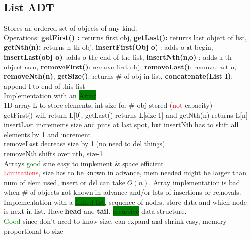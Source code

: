 \subsection{List ADT} Stores an ordered set of objects of any kind. 
\\Operations: \textbf{getFirst() :} returns first obj, \textbf{getLast():} returns last object of list, \textbf{getNth(n):} returns n-th obj, \textbf{insertFirst(Obj o)} : adds o at begin, \textbf{insertLast(obj o)}: adds o the end of the list,\textbf{ insertNth(n,o)} : adds n-th object as o,\textbf{ removeFirst()}: remove first obj, \textbf{removeLast()}: remove last o, \textbf{removeNth(n)}, \textbf{getSize()}: returns \# of obj in list, \textbf{concatenate(List I)}: append I to end of this list
\\ Implementation with an \colorbox{Green}{Array}
\\ 1D array L to store elements, int size for \# obj stored (\textcolor{Red}{not} capacity)
\\ getFirst() will return L[0], getLast() returns L[size-1] and getNth(n) returns L[n]
\\ insertLast increments size and puts at last spot, but insertNth has to shift all elements by 1 and increment
\\removeLast decrease size by 1 (no need to del things)
\\removeNth shifts over nth, size-1
\\ Arrays \textcolor{Green}{good} sine easy to implement \& space efficient
\\ \textcolor{Red}{Limitations}, size has to be known in advance, mem needed might be larger than num of elem used, insert or del can take $O(n)$. Array implementation is bad when \# of objects not known in advance and/or lots of insertions or removals.
\\ Implementation with a \colorbox{Green}{linked-list}, sequence of nodes, store data and which node is next in list. Have \textbf{head} and \textbf{tail}. \colorbox{Green}{recursive} data structure.
\\ \textcolor{Green}{Good} since don't need to know size, can expand and shrink easy, memory proportional to size
